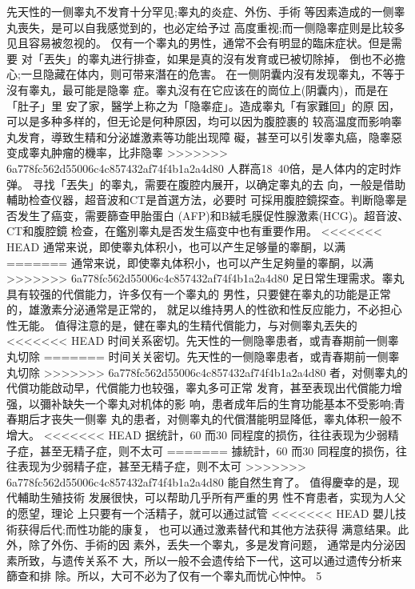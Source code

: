 \documentclass[12pt,UTF8]{ctexbook}
\begin{document}
先天性的一侧睾丸不发育十分罕见;睾丸的炎症、外伤、手術
等因素造成的一侧睾丸喪失，是可以自我感觉到的，也必定给予过
高度重视;而一侧隐睾症则是比较多见且容易被忽视的。
仅有一个睾丸的男性，通常不会有明显的臨床症状。但是需要
对「丟失」的睾丸进行排查，如果是真的沒有发育或已被切除掉，
倒也不必擔心;一旦隐藏在体内，则可带来潛在的危害。
在一侧阴囊内沒有发现睾丸，不等于沒有睾丸，最可能是隐睾
症。睾丸沒有在它应该在的崗位上(阴囊内)，而是在「肚子」里
安了家，醫学上称之为「隐睾症」。造成睾丸「有家難回」的原
因，可以是多种多样的，但无论是何种原因，均可以因为腹腔裹的
较高温度而影响睾丸发育，導致生精和分泌雄激素等功能出现障
礙，甚至可以引发睾丸癌，隐睾惡变成睾丸肿瘤的機率，比非隐睾
>>>>>>> 6a778fc562d55006c4c857432af74f4b1a2a4d80
人群高18~40倍，是人体内的定时炸弹。
寻找「丟失」的睾丸，需要在腹腔内展开，以确定睾丸的去
向，一般是借助輔助检查仪器，超音波和CT是首選方法，必要时
可採用腹腔鏡探查。判断隐睾是否发生了癌变，需要篩查甲胎蛋白
(AFP)和B絨毛膜促性腺激素(HCG)。超音波、CT和腹腔鏡
检查，在鑑別睾丸是否发生癌变中也有重要作用。
<<<<<<< HEAD
通常来说，即使睾丸体积小，也可以产生足够量的睾酮，以满
=======
通常来说，即使睾丸体积小，也可以产生足夠量的睾酮，以满
>>>>>>> 6a778fc562d55006c4c857432af74f4b1a2a4d80
足日常生理需求。睾丸具有较强的代償能力，许多仅有一个睾丸的
男性，只要健在睾丸的功能是正常的，雄激素分泌通常是正常的，
就足以维持男人的性欲和性反应能力，不必担心性无能。
值得注意的是，健在睾丸的生精代償能力，与对侧睾丸丟失的
<<<<<<< HEAD
时间关系密切。先天性的一侧隐睾患者，或青春期前一侧睾丸切除
=======
时间关关密切。先天性的一侧隐睾患者，或青春期前一侧睾丸切除
>>>>>>> 6a778fc562d55006c4c857432af74f4b1a2a4d80
者，对侧睾丸的代償功能啟动早，代償能力也较强，睾丸多可正常
发育，甚至表现出代償能力增强，以彌补缺失一个睾丸对机体的影
响，患者成年后的生育功能基本不受影响;青春期后才丧失一侧睾
丸的患者，对侧睾丸的代償潛能明显降低，睾丸体积一般不增大。
<<<<<<< HEAD
据统計，60%
而30%
同程度的损伤，往往表现为少弱精子症，甚至无精子症，则不太可
=======
據統計，60%
而30%
同程度的损伤，往往表现为少弱精子症，甚至无精子症，则不太可
>>>>>>> 6a778fc562d55006c4c857432af74f4b1a2a4d80
能自然生育了。
值得慶幸的是，现代輔助生殖技術
发展很快，可以帮助几乎所有严重的男
性不育患者，实现为人父的愿望，理论
上只要有一个活精子，就可以通过試管
<<<<<<< HEAD
嬰儿技術获得后代;而性功能的康复，
也可以通过激素替代和其他方法获得
满意结果。此外，除了外伤、手術的因
素外，丢失一个睾丸，多是发育问题，
通常是内分泌因素所致，与遗传关系不
大，所以一般不会遗传给下一代，这可以通过遗传分析来篩查和排
除。所以，大可不必为了仅有一个睾丸而忧心忡忡。
5
\end{document}
